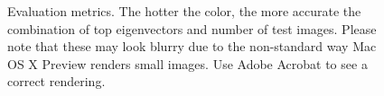 \documentclass[11pt]{report}
\begin{document}
\begin{figure}[H]
  \centering
  \hfil

  \hfil

  \caption{Evaluation metrics. The hotter the color, the more accurate the combination of top eigenvectors and number of test images. Please note that these may look blurry due to the non-standard way Mac OS X Preview renders small images. Use Adobe Acrobat to see a correct rendering.}
  \label{fig:metrics}
\end{figure}
\end{document}
